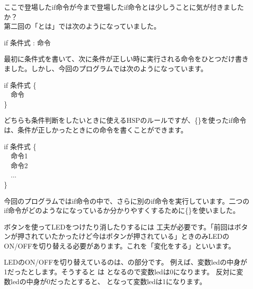 ここで登場したif命令が今まで登場したif命令とは少しうことに気が付きましたか？\\
第二回の「とは」では次のようになっていました。\\
\begin{center}
 					if 条件式 : 命令 \\
\end{center}
最初に条件式を書いて、次に条件が正しい時に実行される命令をひとつだけ書きました。しかし、今回のプログラムでは次のようになっています。\\
\begin{center}
  \begin{minipage}{4cm}
    if 条件式 \{\\ \ \ 命令\\ \}
  \end{minipage}
\end{center}
どちらも条件判断をしたいときに使えるHSPのルールですが、\{\}を使ったif命令は、条件が正しかったときにの命令を書くことができます。\\
\begin{center}
  \begin{minipage}{4cm}
					if 条件式 \{\\
					  \ \ 命令1\\
					  \ \ 命令2\\
					  \ \ ...\\
					\}\\
  \end{minipage}
\end{center}
今回のプログラムではif命令の中で、さらに別のif命令を実行しています。二つのif命令がどのようなになっているか分かりやすくするために\{\}を使いました。\\

\begin{center}

\end{center}

ボタンを使ってLEDをつけたり消したりするには 工夫が必要です。「前回はボタンが押されていたかったけど今はボタンが押されている」ときのみLEDのON/OFFを切り替える必要があります。これを「変化をする」といいます。

LEDのON/OFFを切り替えているのは、の部分です。
例えば、変数ledの中身が1だったとします。そうすると は となるので変数ledは0になります。
反対に変数ledの中身が0だったとすると、 となって変数ledは1になります。

